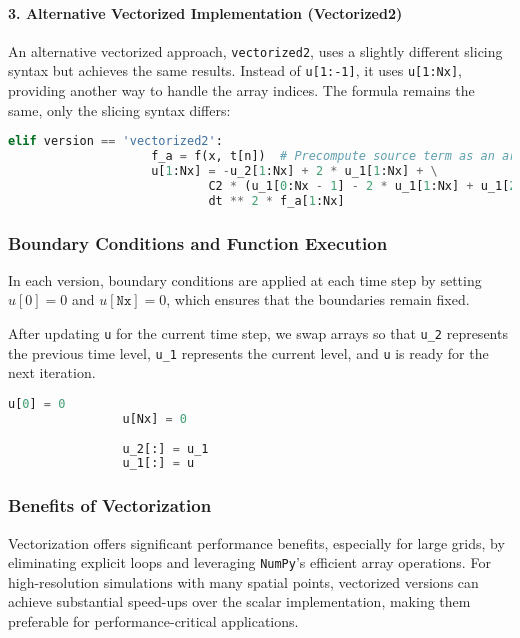 \documentclass{article}
\begin{document}
		    \paragraph{3. Alternative Vectorized Implementation (Vectorized2)}
		    
		    An alternative vectorized approach, \texttt{vectorized2}, uses a slightly different slicing syntax but achieves the same results. Instead of \texttt{u[1:-1]}, it uses \texttt{u[1:Nx]}, providing another way to handle the array indices. The formula remains the same, only the slicing syntax differs:
		    
		    \begin{lstlisting}[language=Python, caption=Alternative Vectorized Implementation]
		    	elif version == 'vectorized2':
			    	f_a = f(x, t[n])  # Precompute source term as an array
			    	u[1:Nx] = -u_2[1:Nx] + 2 * u_1[1:Nx] + \
						    C2 * (u_1[0:Nx - 1] - 2 * u_1[1:Nx] + u_1[2:Nx + 1]) + \
						    dt ** 2 * f_a[1:Nx]
		    \end{lstlisting}
		    
		    \subsubsection{Boundary Conditions and Function Execution}
		    
		    In each version, boundary conditions are applied at each time step by setting $u[0] = 0$ and $u[\texttt{Nx}] = 0$, which ensures that the boundaries remain fixed.
		    
		    After updating \texttt{u} for the current time step, we swap arrays so that \texttt{u\_2} represents the previous time level, \texttt{u\_1} represents the current level, and \texttt{u} is ready for the next iteration.
		    
		    \begin{lstlisting}[language=Python, caption=Boundary Conditions and Swapping Arrays]
		    	u[0] = 0
		    	u[Nx] = 0
		    	
		    	u_2[:] = u_1
		    	u_1[:] = u
		    \end{lstlisting}
		    
		    \subsubsection{Benefits of Vectorization}
		    
		    Vectorization offers significant performance benefits, especially for large grids, by eliminating explicit loops and leveraging \texttt{NumPy}’s efficient array operations. For high-resolution simulations with many spatial points, vectorized versions can achieve substantial speed-ups over the scalar implementation, making them preferable for performance-critical applications.
	    
\end{document}
